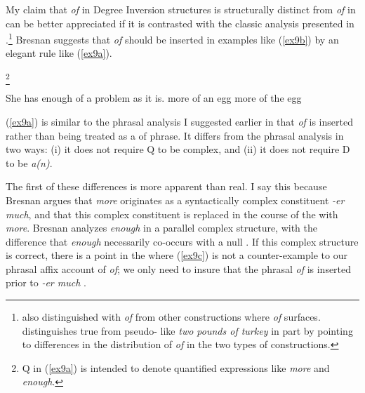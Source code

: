 \documentclass[output=paper,
modfonts
]{LSP/langsci}
\begin{document}
My claim that {\textit{of}} in Degree Inversion structures is structurally distinct from {\textit{of}} in  can be better appreciated if it is contrasted with the classic analysis presented in {\citet{Bresnan73}}.{\footnote{ {\citet{Stockwell73}} also distinguished  with {\textit{of}} from other constructions where {\textit{of}} surfaces.  {\citet{Selkirk77}} distinguishes true  from pseudo- like {\textit{two pounds of turkey}} in part by pointing to differences in the distribution of {\textit{of}} in the two types of constructions.}}
  Bresnan suggests that {\textit{of}} should be inserted in examples like ({\ref{ex9b}}) by an elegant rule like ({\ref{ex9a}}).{\footnote{Q in ({\ref{ex9a}}) is intended to denote quantified expressions like {\textit{more}} and {\textit{enough}}. }

\begin{exe}
\ex\label{ex9a}  
\ex\label{ex9b}  She has enough of a problem as it is.
\ex\label{ex9c}  more of an egg
\ex\label{ex9d}  more of the egg
\end{exe}
({\ref{ex9a}}) is similar to the phrasal  analysis I suggested earlier in that {\textit{of}} is inserted rather than being treated as a  of phrase.  It differs from the phrasal  analysis in two ways:  (i)  it does not require Q to be complex, and (ii) it does not require D to be {\textit{a(n)}}.  

The first of these differences is more apparent than real.  I say this because Bresnan argues that {\textit{more}} originates as a syntactically complex constituent {\textit{-er much}}, and that this complex constituent is replaced in the course of the  with {\textit{more}}.  Bresnan analyzes {\textit{enough}} in a parallel complex structure, with the difference that {\textit{enough}} necessarily co-occurs with a null .  If this complex structure is correct, there is a point in the  where ({\ref{ex9c}}) is not a counter-example to our phrasal affix account of {\textit{of}}; we only need to insure that the phrasal  {\textit{of}} is inserted prior to {\textit{-er much}} .

}
\end{document}
